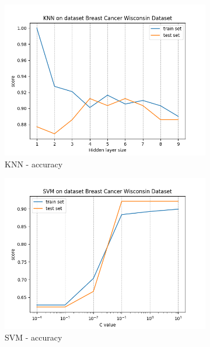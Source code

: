 \documentclass[12pt]{article}
\newcommand*{\subfigwidth}{0.24\textwidth}
\begin{document}
\begin{figure}[H]\centering
    \begin{subfigure}[t]{\subfigwidth}
        \includegraphics[width=\linewidth]{img/other_datasets/knn/breast_accuracy.png}
        \caption{KNN - accuracy}
    \end{subfigure}
    \hfill
    \begin{subfigure}[t]{\subfigwidth}
        \includegraphics[width=\linewidth]{img/other_datasets/svm/breast_accuracy.png}
        \caption{SVM - accuracy}
    \end{subfigure}
    \hfill
    \begin{subfigure}[t]{\subfigwidth}

\end{subfigure}
\end{figure}
\end{document}
